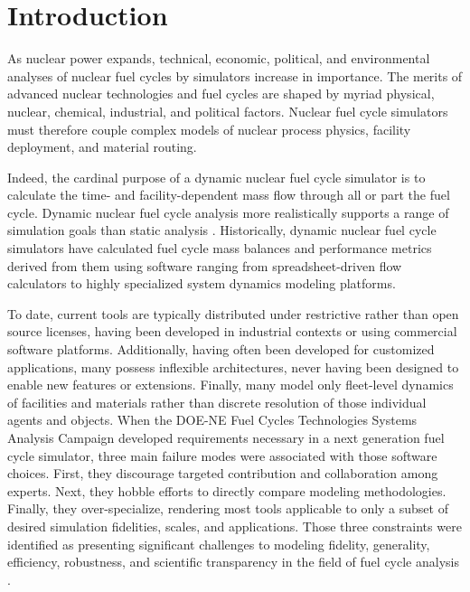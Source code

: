 
\section{Introduction}



As nuclear power expands, technical, economic, political, and environmental
analyses of nuclear fuel cycles by simulators increase in importance. The
merits of advanced nuclear technologies and fuel cycles are
shaped by myriad physical, nuclear, chemical, industrial, and political
factors. Nuclear fuel cycle simulators must therefore couple complex models of
nuclear process physics, facility deployment, and material routing.

Indeed, the cardinal purpose of a dynamic nuclear fuel cycle simulator is to calculate
the time- and facility-dependent mass flow through all or part the fuel cycle.
Dynamic nuclear fuel cycle analysis more realistically supports a range of
simulation goals than static analysis \cite{piet_dynamic_2011}. Historically,
dynamic nuclear fuel cycle simulators have calculated fuel cycle mass balances
and performance metrics derived from them using software ranging from
spreadsheet-driven flow calculators to highly specialized system dynamics
modeling platforms.

To date, current tools are typically distributed under restrictive rather than open
source licenses, having been developed in industrial contexts or using 
commercial software platforms. Additionally, having
often been developed for customized applications, many possess inflexible
architectures, never having been designed to enable new features or extensions.
Finally, many model only fleet-level dynamics of facilities and
materials rather than discrete resolution of those individual agents and
objects. When the DOE-NE Fuel Cycles Technologies Systems Analysis Campaign
developed requirements necessary in a next generation fuel cycle simulator,
three main failure modes were associated with those software choices.
First, they discourage targeted
contribution and collaboration among experts. Next, they hobble efforts to
directly compare modeling methodologies. Finally, they over-specialize,
rendering most tools applicable to only a subset of desired simulation
fidelities, scales, and applications. Those three constraints were identified
as presenting significant challenges to modeling fidelity, generality, efficiency,
robustness, and scientific transparency in the field of fuel cycle analysis
\cite{huff_next_2010}.

